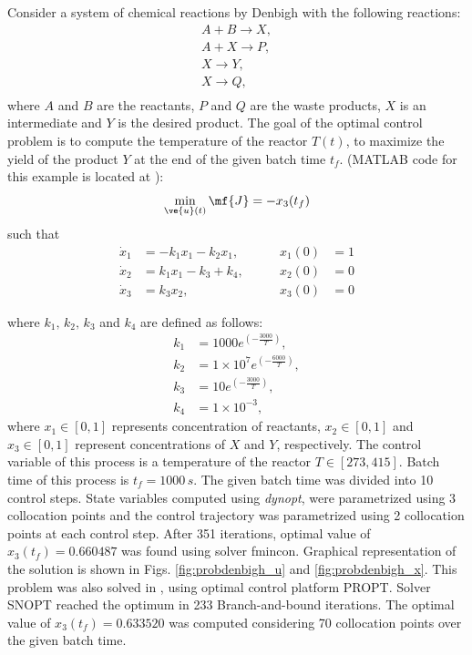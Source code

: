 Consider a system of chemical reactions by Denbigh \cite{den58} with the 
following reactions:
\begin{gather}
A + B \rightarrow X, \\
A + X \rightarrow P, \\
X \rightarrow Y, \\
X \rightarrow Q, \\
\end{gather}
where $A$ and $B$ are the reactants, $P$ and $Q$ are the waste products, $X$ is an intermediate and $Y$ is the desired product. The goal of the optimal control problem is to compute the temperature of the reactor $T(t)$, to maximize the yield of the product $Y$ at the end of the given batch time $t_f$. (MATLAB code for this example is located
at ):
\begin{equation}
\min_{\ve{u}(t)} \mf{J} = -x_{3}(t_{f}) \label{eq:denbigh_dae}
\end{equation}
such that
\begin{align}
\dot{x}_1 & =  -k_{1}x_{1} -k_{2}x_{1} , &\qquad x_1(0) &= 1 \\
\dot{x}_{2}& = k_{1}x_{1} - k_{3} + k_{4} , & \qquad x_2(0) & = 0 \\
\dot{x}_3 & =  k_{3}x_{2} , & \qquad x_3(0) & = 0 
\end{align}

where $k_{1}, \, k_{2}, \, k_{3}$ and $k_{4}$ are defined as follows:
\begin{align}
k_{1} &= 1000 e^{(-\frac{3000}{T})}, \\
k_{2} &= 1 \times 10^{7} e^{(-\frac{6000}{T})}, \\
k_{3} &= 10e^{(-\frac{3000}{T})}, \\
k_{4} &= 1 \times 10^{-3}, 
\end{align} where $x_{1} \in [0, 1] $  represents concentration
of reactants, $x_{2} \in [0, 1] $ and $x_{3} \in [0, 1]$  represent concentrations
of $X$ and $Y$, respectively. The control variable of this process is a temperature of the reactor $T \in [273, 415]$.
Batch time of this process is $t_{f} = 1000 \, s$. The given batch time was divided into 10 control steps. State variables computed using \emph{dynopt}, were parametrized using 3 collocation points and the control trajectory was parametrized using 2 collocation points at each control step.  After 351 iterations, optimal value of $x_{3}(t_{f}) = 0.660487$ was
found using solver fmincon. Graphical representation of the solution is shown in Figs. \ref{fig:probdenbigh_u}
and \ref{fig:probdenbigh_x}. This problem was also solved in \cite{rut10}, using optimal control platform PROPT. Solver SNOPT reached the optimum in 233 Branch-and-bound iterations. The optimal value of  $x_{3}(t_{f}) = 0.633520$ was computed considering 70 collocation points over the given batch time. 

